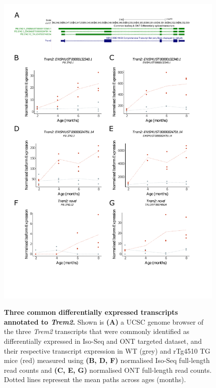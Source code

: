\begin{figure}[htp]
	\centering
	\includegraphics[page=1,trim={0 3cm 0 0},scale =0.75]{Figures/DiffCommon.pdf}
	\captionsetup{width=0.95\textwidth}
	\label{fig:diffcommon_1}
	\caption[Three common differentially expressed transcripts annotated to \textit{Trem2}]%
	{\textbf{Three common differentially expressed transcripts annotated to \textit{Trem2}.} Shown is \textbf{(A)} a UCSC genome browser of the three \textit{Trem2} transcripts that were commonly identified as differentially expressed in Iso-Seq and ONT targeted dataset, and their respective transcript expression in WT (grey) and rTg4510 TG mice (red) measured using \textbf{(B, D, F)} normalised Iso-Seq full-length read counts and \textbf{(C, E, G)} normalised ONT full-length read counts. Dotted lines represent the mean paths across ages (months).}   
\end{figure}

